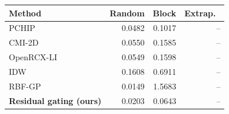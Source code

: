 \small
\begin{tabular}{lrrr}\toprule
Method & Random & Block & Extrap.\ \\\midrule
PCHIP & 0.0482 & 0.1017 & -- \\
CMI-2D & 0.0550 & 0.1585 & -- \\
OpenRCX-LI & 0.0549 & 0.1598 & -- \\
IDW & 0.1608 & 0.6911 & -- \\
RBF-GP & 0.0149 & 1.5683 & -- \\
\textbf{Residual gating (ours)} & 0.0203 & 0.0643 & -- \\
\bottomrule\end{tabular}
